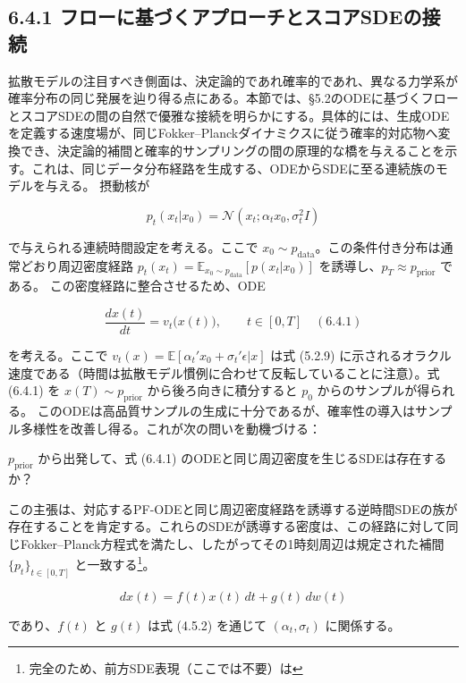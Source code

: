 \subsection*{6.4.1 フローに基づくアプローチとスコアSDEの接続}


拡散モデルの注目すべき側面は、決定論的であれ確率的であれ、異なる力学系が確率分布の同じ発展を辿り得る点にある。本節では、§5.2のODEに基づくフローとスコアSDEの間の自然で優雅な接続を明らかにする。具体的には、生成ODEを定義する速度場が、同じFokker–Planckダイナミクスに従う確率的対応物へ変換でき、決定論的補間と確率的サンプリングの間の原理的な橋を与えることを示す。これは、同じデータ分布経路を生成する、ODEからSDEに至る連続族のモデルを与える。
摂動核が

\[
p_t(x_t|x_0)=\mathcal{N}(x_t;\alpha_t x_0,\sigma_t^2 I)
\]


で与えられる連続時間設定を考える。ここで $x_0\sim p_{\mathrm{data}}$。この条件付き分布は通常どおり周辺密度経路 $p_t(x_t)=\mathbb{E}_{x_0\sim p_{\mathrm{data}}}[p(x_t|x_0)]$ を誘導し、$p_T\approx p_{\mathrm{prior}}$ である。
この密度経路に整合させるため、ODE

\[
\frac{dx(t)}{dt}=v_t\bigl(x(t)\bigr),\qquad t\in[0,T] \quad (6.4.1)
\]


を考える。ここで $v_t(x)=\mathbb{E}[\alpha_t'x_0+\sigma_t'\epsilon|x]$ は式 (5.2.9) に示されるオラクル速度である（時間は拡散モデル慣例に合わせて反転していることに注意）。式 (6.4.1) を $x(T)\sim p_{\mathrm{prior}}$ から後ろ向きに積分すると $p_0$ からのサンプルが得られる。
このODEは高品質サンプルの生成に十分であるが、確率性の導入はサンプル多様性を改善し得る。これが次の問いを動機づける：

\begin{propositionbox}[問い 6.4.1]
$p_{\mathrm{prior}}$ から出発して、式 (6.4.1) のODEと同じ周辺密度を生じるSDEは存在するか？
\end{propositionbox}


この主張は、対応するPF-ODEと同じ周辺密度経路を誘導する逆時間SDEの族が存在することを肯定する。これらのSDEが誘導する密度は、この経路に対して同じFokker–Planck方程式を満たし、したがってその1時刻周辺は規定された補間 $\{p_t\}_{t\in[0,T]}$ と一致する\footnote{完全のため、前方SDE表現（ここでは不要）は}。

\[
dx(t)=f(t)x(t)\,dt+g(t)\,dw(t)
\]

であり、$f(t)$ と $g(t)$ は式 (4.5.2) を通じて $(\alpha_t,\sigma_t)$ に関係する。

